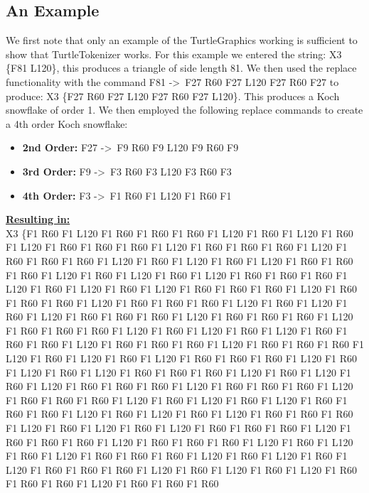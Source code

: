 \documentclass[12pt]{article}
\begin{document}

\subsection{An Example}
We first note that only an example of the TurtleGraphics working is sufficient to
show that TurtleTokenizer works. For this example we entered the string:
 X3 \{F81 L120\}, this produces a triangle of side length 81. We then used the
 replace functionality with the command F81 -\textgreater\ F27 R60 F27 L120 F27 R60 F27
 to produce: X3 \{F27 R60 F27 L120 F27 R60 F27 L120\}. This produces a Koch snowflake
 of order 1.  We then employed the following replace commands to create a 4th order Koch
 snowflake:
 \begin{itemize}
   \item \textbf{2nd Order:} F27 -\textgreater\ F9 R60 F9 L120 F9 R60 F9
   \item \textbf{3rd Order:} F9 -\textgreater\ F3 R60 F3 L120 F3 R60 F3
   \item \textbf{4th Order:} F3 -\textgreater\ F1 R60 F1 L120 F1 R60 F1
 \end{itemize}
 \textbf{\underline{Resulting in:}} \\
 X3 \{F1 R60 F1 L120 F1 R60 F1 R60 F1 R60 F1 L120 F1 R60 F1 L120 F1 R60 F1
 L120 F1 R60 F1 R60 F1 R60 F1 L120 F1 R60 F1 R60 F1 R60 F1 L120 F1 R60 F1 R60 F1 R60 F1
 L120 F1 R60 F1 L120 F1 R60 F1 L120 F1 R60 F1 R60 F1 R60 F1 L120 F1 R60 F1 L120 F1 R60
 F1 L120 F1 R60 F1 R60 F1 R60 F1 L120 F1 R60 F1 L120 F1 R60 F1 L120 F1 R60 F1 R60 F1 R60
 F1 L120 F1 R60 F1 R60 F1 R60 F1 L120 F1 R60 F1 R60 F1 R60 F1 L120 F1 R60 F1 L120 F1 R60
 F1 L120 F1 R60 F1 R60 F1 R60 F1 L120 F1 R60 F1 R60 F1 R60 F1 L120 F1 R60 F1 R60 F1 R60
 F1 L120 F1 R60 F1 L120 F1 R60 F1 L120 F1 R60 F1 R60 F1 R60 F1 L120 F1 R60 F1 R60 F1 R60
 F1 L120 F1 R60 F1 R60 F1 R60 F1 L120 F1 R60 F1 L120 F1 R60 F1 L120 F1 R60 F1 R60 F1 R60
 F1 L120 F1 R60 F1 L120 F1 R60 F1 L120 F1 R60 F1 R60 F1 R60 F1 L120 F1 R60 F1 L120 F1 R60
 F1 L120 F1 R60 F1 R60 F1 R60 F1 L120 F1 R60 F1 R60 F1 R60 F1 L120 F1 R60 F1 R60 F1 R60
 F1 L120 F1 R60 F1 L120 F1 R60 F1 L120 F1 R60 F1 R60 F1 R60 F1 L120 F1 R60 F1 L120 F1 R60
 F1 L120 F1 R60 F1 R60 F1 R60 F1 L120 F1 R60 F1 L120 F1 R60 F1 L120 F1 R60 F1 R60 F1 R60
 F1 L120 F1 R60 F1 R60 F1 R60 F1 L120 F1 R60 F1 R60 F1 R60 F1 L120 F1 R60 F1 L120 F1 R60
 F1 L120 F1 R60 F1 R60 F1 R60 F1 L120 F1 R60 F1 L120 F1 R60 F1 L120 F1 R60 F1 R60 F1 R60
 F1 L120 F1 R60 F1 L120 F1 R60 F1 L120 F1 R60 F1 R60 F1 R60 F1 L120 F1 R60 F1 R60 F1 R60
\end{document}
